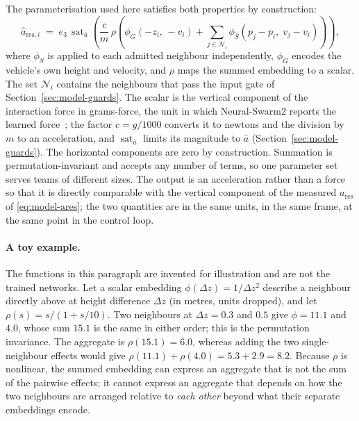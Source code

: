 The parameterisation used here satisfies both properties by construction:
%
\begin{equation}
  \hat{a}_{\mathrm{res},i}
  \;=\; e_3\,\operatorname{sat}_{\bar a}\!\left( \frac{c}{m}\,
     \rho\!\left( \phi_G\!\left(-z_i,\, -v_i\right)
       + \sum_{j \in \mathcal{N}_i} \phi_S\!\left( p_j - p_i,\; v_j - v_i \right) \right) \right),
  \label{eq:model-deepsets}
\end{equation}
%
where $\phi_S$ is applied to each admitted neighbour independently, $\phi_G$ encodes the vehicle's
own height and velocity, and $\rho$ maps the summed embedding to a scalar. The set
$\mathcal{N}_i$ contains the neighbours that pass the input gate of
Section~\ref{sec:model-guards}. The scalar is the vertical component of the interaction force in
grams-force, the unit in which Neural-Swarm2 reports the learned force~\cite{shi2022neuralswarm2}; the factor $c = g/1000$ converts it to
newtons and the division by $m$ to an acceleration, and $\operatorname{sat}_{\bar a}$ limits its
magnitude to $\bar a$ (Section~\ref{sec:model-guards}). The horizontal components are zero by
construction. Summation is permutation-invariant and accepts any number of terms, so one parameter
set serves teams of different sizes. The output is an acceleration rather than a force so that it
is directly comparable with the vertical component of the measured $a_{\mathrm{res}}$ of
\eqref{eq:model-ares}; the two quantities are in the same units, in the same frame, at the same
point in the control loop.

\paragraph{A toy example.} The functions in this paragraph are invented for illustration and are
not the trained networks. Let a scalar embedding $\phi(\Delta z) = 1/\Delta z^2$ describe a
neighbour directly above at height difference $\Delta z$ (in metres, units dropped), and let
$\rho(s) = s/(1 + s/10)$. Two neighbours at $\Delta z = 0.3$ and $0.5$ give
$\phi = 11.1$ and $4.0$, whose sum $15.1$ is the same in either order; this is the permutation
invariance. The aggregate is $\rho(15.1) = 6.0$, whereas adding the two single-neighbour effects
would give $\rho(11.1) + \rho(4.0) = 5.3 + 2.9 = 8.2$. Because $\rho$ is nonlinear, the summed
embedding can express an aggregate that is not the sum of the pairwise effects; it cannot express
an aggregate that depends on how the two neighbours are arranged relative to \emph{each other}
beyond what their separate embeddings encode.

